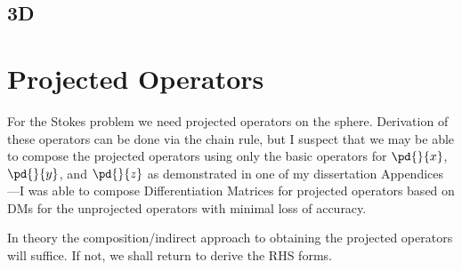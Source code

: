\documentclass[11pt]{report}
\begin{document}
{\subsection{3D}


\section{Projected Operators}

For the Stokes problem we need projected operators on the sphere. Derivation of these operators can be done via the chain rule, but I suspect that we may be able to compose the projected operators using only the basic operators for $\pd{}{x}$,  $\pd{}{y}$, and $\pd{}{z}$ as demonstrated in one of my dissertation Appendices---I was able to compose Differentiation Matrices for projected operators based on DMs for the unprojected operators with minimal loss of accuracy. 

In theory the composition/indirect approach to obtaining the projected operators will suffice. If not, we shall return to derive the RHS forms. 


}

%
%
\end{document}
